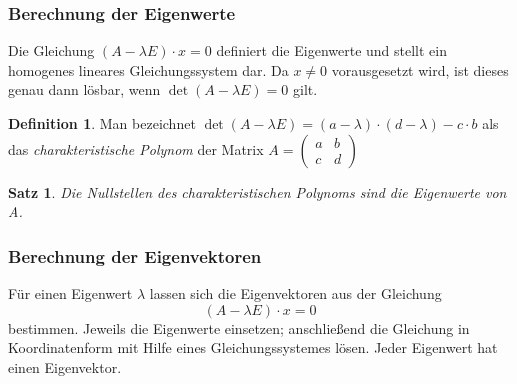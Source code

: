 \documentclass[a4paper,10pt,DIV9, BCOR12mm, oneside,openright,openbib]{scrreprt}
\theoremstyle{definition}
\newtheorem{mydef}{Definition}[section]
\theoremstyle{plain}
\newtheorem{mysat}{Satz}[section]
\begin{document}
\subsubsection{Berechnung der Eigenwerte}
Die Gleichung $\left(A - \lambda E\right) \cdot x = 0$ definiert die Eigenwerte und stellt ein homogenes lineares Gleichungssystem dar. Da $x \neq 0$ vorausgesetzt wird, ist dieses genau dann lösbar, wenn $\det\left(A - \lambda E\right) = 0$ gilt.

 \begin{mydef}
  Man bezeichnet $\det\left(A - \lambda E\right) = (a-\lambda) \cdot (d-\lambda) - c \cdot b$ als das \textit{charakteristische Polynom} der Matrix $ A =\begin{pmatrix} a & b \\ c & d \end{pmatrix} $
 \end{mydef}
 
 \begin{mysat}
  Die Nullstellen des charakteristischen Polynoms sind die Eigenwerte von A.
 \end{mysat}
 
\subsubsection{Berechnung der Eigenvektoren}
 Für einen Eigenwert $\lambda$ lassen sich die Eigenvektoren aus der Gleichung \[(A-\lambda E) \cdot x = 0\] bestimmen. Jeweils die Eigenwerte einsetzen; anschließend die Gleichung in Koordinatenform mit Hilfe eines Gleichungssystemes lösen. Jeder Eigenwert hat einen Eigenvektor.
 
\end{document}
